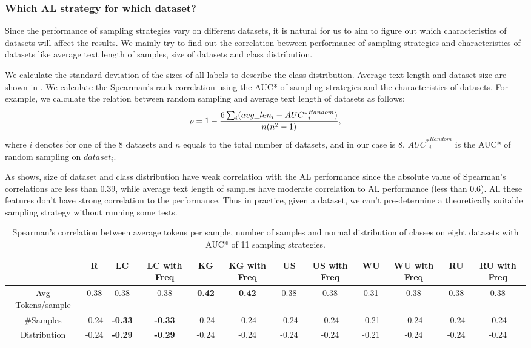 \vspace{-0.5cm}
\subsubsection{Which AL strategy for which dataset?}
Since the performance of sampling strategies vary on different datasets, it is natural for us to aim to figure out which characteristics of datasets will affect the results. We mainly try to find out the correlation between performance of sampling strategies and characteristics of datasets like average text length of samples, size of datasets and class distribution.

We calculate the standard deviation of the sizes of all labels to describe the class distribution. Average text length and dataset size are shown in .  We calculate the Spearman's rank correlation using the AUC* of sampling strategies and the characteristics of datasets. For example, we calculate the relation between random sampling and average text length of datasets as follows:
\vspace{-0.25cm}
\begin{equation}
\footnotesize
    \rho = 1 - \frac{6\sum_i(avg\_len_i - {AUC^*}^{Random}_{i})}{n(n^2 - 1)},
\end{equation}
where $i$ denotes for one of the 8 datasets and $n$ equals to the total number of datasets, 
and in our case is 8. ${AUC^*}^{Random}_{i}$ is the AUC* of random sampling on $dataset_i$.

As  shows, size of dataset and class distribution have weak correlation with the AL performance since the absolute value of Spearman's correlations are less than 0.39, while average text length of samples have moderate correlation to AL performance (less than 0.6). All these features don't have strong correlation to the performance. Thus in practice, given a dataset, we can't pre-determine a theoretically suitable sampling strategy without 
running some tests.

\begin{table}[th]
	\small
	\centering
	\scriptsize
	\setlength{\abovecaptionskip}{0pt}
	\setlength{\belowcaptionskip}{0pt}
	\begin{tabular}{cccccccccccc}
		\toprule
		 &  R & LC & LC with Freq & KG & KG with Freq & US & US with Freq & WU & WU with Freq & RU & RU with Freq\\\hline
		Avg Tokens/sample & 0.38 & 0.38 & 0.38 & \textbf{0.42} & \textbf{0.42} & 0.38 & 0.38 & 0.31 & 0.38 & 0.38 & 0.38 \\
		\#Samples & -0.24 & \textbf{-0.33} & \textbf{-0.33} & -0.24 & -0.24 & -0.24 & -0.24 & -0.21 & -0.24 &-0.24 & -0.24\\
		Distribution & -0.24 & \textbf{-0.29} &\textbf{ -0.29} & -0.24 & -0.24 & -0.24 & -0.24 & -0.21 & -0.24 & -0.24& -0.24 \\ 
		\bottomrule              
	\end{tabular}
\caption{Spearman's correlation between average tokens per sample, number of samples and normal distribution of classes on eight datasets with AUC* of 11 sampling strategies.}
\label{table:correkationOfDataset}
\end{table}

